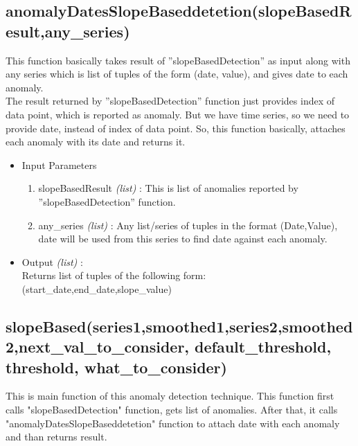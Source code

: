 \subsection{anomalyDatesSlopeBaseddetetion(slopeBasedResult,any\_series)}

This function basically takes result of ”slopeBasedDetection” as input along with
any series which is list of tuples of the form (date, value), and gives date to each
anomaly.\\

The result returned by ”slopeBasedDetection” function just provides index of
data point, which is reported as anomaly. But we have time series, so we need
to provide date, instead of index of data point. So, this function basically,
attaches each anomaly with its date and returns it.\\

\begin{itemize}
 \item Input Parameters
 
 \begin{enumerate}
  \item slopeBasedResult \textit{(list)} : This is list of anomalies reported by ”slopeBasedDetection” function.
  \item any\_series \textit{(list)} : Any list/series of tuples in the format (Date,Value), date will be used from this series to find date against each anomaly.
 \end{enumerate}

 \item Output \textit{(list)} : \\
 	Returns list of tuples of the following form: \\ 
 	(start\_date,end\_date,slope\_value)

\end{itemize}


\subsection{slopeBased(series1,smoothed1,series2,smoothed2,next\_val\_to\_consider, default\_threshold, threshold, what\_to\_consider)}

This is main function of this anomaly detection technique. This function first calls "slopeBasedDetection" function, gets list of anomalies. 
After that, it calls "anomalyDatesSlopeBaseddetetion" function to attach date with each anomaly and than returns result.

